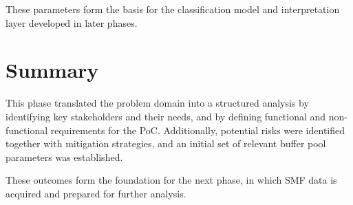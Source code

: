 These parameters form the basis for the classification model and interpretation layer developed in later phases.


\section{Summary}

This phase translated the problem domain into a structured analysis by identifying key stakeholders and their needs, and by defining functional and non-functional requirements for the PoC. Additionally, potential risks were identified together with mitigation strategies, and an initial set of relevant buffer pool parameters was established.

These outcomes form the foundation for the next phase, in which SMF data is acquired and prepared for further analysis.